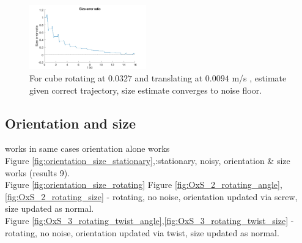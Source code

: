 \begin{figure}
	\centering
  	\includegraphics[width=0.45\textwidth,trim = 0mm 0mm 0mm 0mm,clip]{./Figures/size_error_ratio_2_RT_noise}\vspace*{0ex}
	\caption{ For cube rotating at $0.0327$ and translating at $0.0094$ m/s , estimate given correct trajectory, size estimate converges to noise floor.}
  	\label{fig:size_RT_noise}
\end{figure}

\subsection{Orientation and size}      
works in same cases orientation alone works\\
Figure \ref{fig:orientation_size_stationary},:stationary, noisy, orientation \& size works (results 9).\\
Figure \ref{fig:orientation_size_rotating}
Figure \ref{fig:OxS_2_rotating_angle},\ref{fig:OxS_2_rotating_size} - rotating, no noise, orientation updated via screw, size updated as normal. \\ 
Figure \ref{fig:OxS_3_rotating_twist_angle},\ref{fig:OxS_3_rotating_twist_size} - rotating, no noise, orientation updated via twist, size updated as normal.

